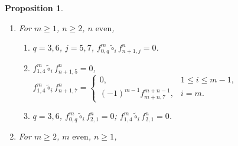 \documentclass[10pt, reqno]{amsart}
\newtheorem{prop}[theorem]{Proposition}
\theoremstyle{definition}
\theoremstyle{remark}
\numberwithin{equation}{section}
\begin{document}
\begin{prop}
\begin{enumerate}
\begin{enumerate}
            $f_{1,4}^m \tilde{\circ}_i f_{0,6}^n = \begin{cases}
                0, & 1\le i\le m-1,\\
               \varepsilon_{m,n} f_{0,6}^{m+n-1}, & i=m.
            \end{cases}$
            \item \(q=1,4\), \( f_{1,q}^m \tilde{\circ}_i f_{1,4}^n = \begin{cases}
                0, & 1\le i\le m-1,\\
               \varepsilon_{m,n} f_{1,q}^{m+n-1}, & i=m.
            \end{cases} \)
            \item $q=1,4$, \( f_{1,q}^m \tilde{\circ}_i f_{1,1}^n = 0\).
        \end{enumerate}
        \item For \(m\ge 1\), \(n\ge 2\), \(n \text{ even}\), \begin{enumerate}
            \item \(q=3,6\), \(j=5,7\), \(f_{0,q}^m \tilde{\circ}_i f_{n+1,j}^n = 0\).
            \item $f_{1,4}^m \tilde{\circ}_i f_{n+1,5}^n = 0$,  $f_{1,4}^m \tilde{\circ}_i f_{n+1,7}^n = \begin{cases}
                0, & 1\le i \le m-1, \\
                (-1)^{m-1}f_{m+n,7}^{m+n-1}, &i=m.
            \end{cases}$ 
            \item \(q=3,6\), $f_{0,q}^m \tilde{\circ}_i f_{2,1}^n = 0$; $f_{1,4}^m \tilde{\circ}_i f_{2,1}^n = 0$.
        \end{enumerate}
        \item  For \(m\ge 2\), \(m \text{ even}\), \(n\ge 1\), 
\end{enumerate}
\end{prop}
\end{document}
